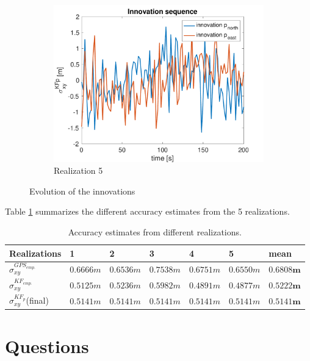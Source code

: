 \documentclass{article}
\begin{document}
\begin{figure}[H]
\begin{subfigure}[t]{0.49\textwidth}
        \includegraphics[width=\textwidth]{5_innovation}
        \caption{Realization 5}
    \end{subfigure}
    \caption{Evolution of the innovations}
    \label{fig:error_gyro}
\end{figure}

\newpage

Table \ref{tab:std_dev} summarizes the different accuracy estimates from the 5 realizations.

\begin{table}[h]
\centering
\begin{tabular}{lllllll}
Realizations  & 1 & 2 & 3 & 4 & 5 & mean\\
\hline
$\sigma_{xy}^{GPS_{emp.}}$ & $0.6666 \si{m}$ & $0.6536 \si{m}$ & $0.7538 \si{m}$ & $0.6751 \si{m}$ & $0.6550 \si{m}$ & $\mathbf{0.6808 \si{m}}$\\
$\sigma_{xy}^{KF_{emp.}}$  & $0.5125 \si{m}$ & $0.5236 \si{m}$ & $0.5982 \si{m}$ & $0.4891 \si{m}$ & $0.4877 \si{m}$ & $\mathbf{0.5222 \si{m}}$\\
$\sigma_{xy}^{KF_{p}}$(final) & $0.5141 \si{m}$ & $0.5141 \si{m}$ & $0.5141 \si{m}$ & $0.5141 \si{m}$ & $0.5141 \si{m}$ & $\mathbf{0.5141 \si{m}}$
\end{tabular}
\caption{Accuracy estimates from different realizations.}
\label{tab:std_dev}
\end{table}

\section*{Questions}
\end{document}
